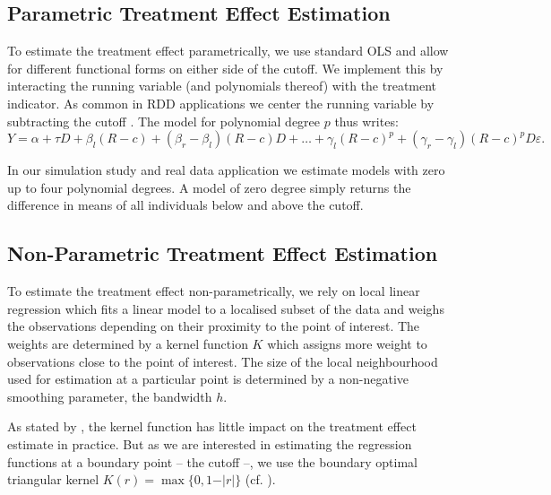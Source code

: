 \documentclass[11pt, a4paper, leqno]{article}
\numberwithin{equation}{section}
\numberwithin{figure}{section}
\numberwithin{table}{section}
\numberwithin{algorithm}{section}
\begin{document}
\subsection{Parametric Treatment Effect Estimation} %
\label{sec: param}
To estimate the treatment effect parametrically, we use standard OLS and allow for different functional forms on either side of the cutoff. We implement this by interacting the running variable (and polynomials thereof) with the treatment indicator. As common in RDD applications we center the running variable by subtracting the cutoff \cite{lee_lemieux}. The model for polynomial degree $p$ thus writes:
\begin{equation}
Y = \alpha + \tau D + \beta_{l} (R-c) + (\beta_{r} - \beta_{l}) (R-c) D + \dots + \gamma_{l} (R-c)^p + (\gamma_{r} - \gamma_{l}) (R-c)^p D \varepsilon .
\label{eq: model_param}
\end{equation}

In our simulation study and real data application we estimate models with zero up to four polynomial degrees. A model of zero degree simply returns the difference in means of all individuals below and above the cutoff.


\subsection{Non-Parametric Treatment Effect Estimation} %
\label{sec: non-param}
To estimate the treatment effect non-parametrically, we rely on local linear regression which fits a linear model to a localised subset of the data and weighs the observations depending on their proximity to the point of interest. The weights are determined by a kernel function $K$ which assigns more weight to observations close to the point of interest. The size of the local neighbourhood used for estimation at a particular point is determined by a non-negative smoothing parameter, the bandwidth $h$.

As stated by \cite{lee_lemieux}, the kernel function has little impact on the treatment effect estimate in practice. But as we are interested in estimating the regression functions at a boundary point -- the cutoff --, we use the boundary optimal triangular kernel $K(r) = \max \lbrace 0, 1 - \vert r \vert \rbrace$ (cf. \cite{cheng_et_al}).
\end{document}
